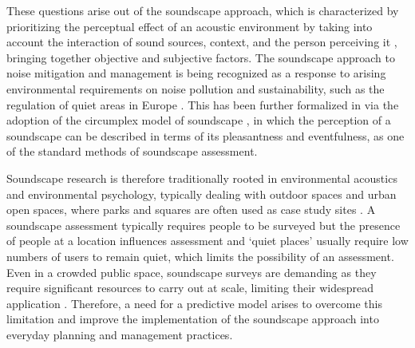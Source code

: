 \documentclass[
  authoryear,
  preprint,
  3p,
  onecolumn]{elsarticle}
\begin{document}
These questions arise out of the soundscape approach, which is
characterized by prioritizing the perceptual effect of an acoustic
environment by taking into account the interaction of sound sources,
context, and the person perceiving it
\citep{ISO12913Part1, Truax1999Handbook}, bringing together objective
and subjective factors. The soundscape approach to noise mitigation and
management is being recognized as a response to arising environmental
requirements on noise pollution and sustainability, such as the
regulation of quiet areas in Europe
\citep{EuropeanUnion2002Directive, Kang2018Impact, Radicchi2021Sound}.
This has been further formalized in \citet{ISO12913Part2} via the
adoption of the circumplex model of soundscape
\citep{Axelsson2010principal}, in which the perception of a soundscape
can be described in terms of its pleasantness and eventfulness, as one
of the standard methods of soundscape assessment.

Soundscape research is therefore traditionally rooted in environmental
acoustics and environmental psychology, typically dealing with outdoor
spaces \citep{Torresin2020Indoor} and urban open spaces, where parks and
squares are often used as case study sites \citep{Kang2006Urban}. A
soundscape assessment typically requires people to be surveyed but the
presence of people at a location influences assessment
\citep{Aletta2018Towards} and `quiet places' usually require low numbers
of users to remain quiet, which limits the possibility of an assessment.
Even in a crowded public space, soundscape surveys are demanding as they
require significant resources to carry out at scale, limiting their
widespread application \citep{Mitchell2020Soundscape}. Therefore, a need
for a predictive model arises to overcome this limitation and improve
the implementation of the soundscape approach into everyday planning and
management practices.
\end{document}
